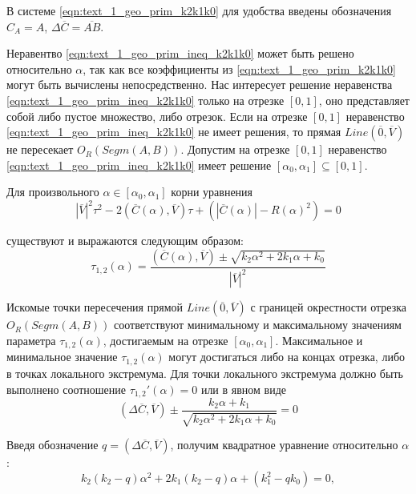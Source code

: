 В системе \eqref{eqn:text_1_geo_prim_k2k1k0} для удобства введены обозначения $C_A = A$, $\Delta \overline{C} = \overline{AB}$.

Неравентво \eqref{eqn:text_1_geo_prim_ineq_k2k1k0} может быть решено относительно $\alpha$, так как все коэффициенты из \eqref{eqn:text_1_geo_prim_k2k1k0} могут быть вычислены непосредственно.
Нас интересует решение неравенства \eqref{eqn:text_1_geo_prim_ineq_k2k1k0} только на отрезке $[0,1]$, оно представляет собой либо пустое множество, либо отрезок.
Если на отрезке $[0,1]$ неравенство \eqref{eqn:text_1_geo_prim_ineq_k2k1k0} не имеет решения, то прямая $Line(\overline{0}, \overline{V})$ не пересекает $O_R(Segm(A, B))$.
Допустим на отрезке $[0,1]$ неравенство \eqref{eqn:text_1_geo_prim_ineq_k2k1k0} имеет решение $[\alpha_0, \alpha_1] \subseteq [0, 1]$.
 
Для произвольного $\alpha \in [\alpha_0, \alpha_1]$ корни уравнения
\begin{equation}
	|\overline{V}|^2 \tau^2 - 2(\overline{C}(\alpha), \overline{V}) \tau + \left( |\overline{C}(\alpha)| - R(\alpha)^2 \right) = 0
\end{equation}

существуют и выражаются следующим образом:
\begin{equation}
	\tau_{1,2}(\alpha) = \frac{(\overline{C}(\alpha), \overline{V}) \pm \sqrt{k_2 \alpha^2 + 2 k_1 \alpha + k_0}}{|\overline{V}|^2}
\end{equation}

Искомые точки пересечения прямой $Line(\overline{0}, \overline{V})$ с границей окрестности отрезка $O_R(Segm(A, B))$ соответствуют минимальному и максимальному значениям параметра $\tau_{1,2}(\alpha)$, достигаемым на отрезке $[\alpha_0, \alpha_1]$.
Максимальное и минимальное значение $\tau_{1,2}(\alpha)$ могут достигаться либо на концах отрезка, либо в точках локального экстремума.
Для точки локального экстремума должно быть выполнено соотношение $\tau_{1,2}'(\alpha) = 0$ или в явном виде
\begin{equation}
	(\Delta \overline{C}, \overline{V}) \pm \frac{k_2 \alpha + k_1}{ \sqrt{k_2 \alpha^2 + 2 k_1 \alpha + k_0} } = 0
\end{equation}

Введя обозначение $q = (\Delta \overline{C}, \overline{V})$, получим квадратное уравнение относительно $\alpha$:
\begin{equation}
	k_2 (k_2 - q) \alpha^2 + 2 k_1 (k_2 - q) \alpha + (k_1^2 - q k_0) = 0,
\end{equation}

